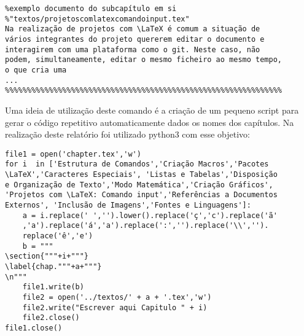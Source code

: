 \begin{verbatim}
%exemplo documento do subcapítulo em si
%"textos/projetoscomlatexcomandoinput.tex"
Na realização de projetos com \LaTeX é comum a situação de
vários integrantes do projeto quererem editar o documento e
interagirem com uma plataforma como o git. Neste caso, não
podem, simultaneamente, editar o mesmo ficheiro ao mesmo tempo,
o que cria uma
...
%%%%%%%%%%%%%%%%%%%%%%%%%%%%%%%%%%%%%%%%%%%%%%%%%%%%%%%%%%%%%%%
\end{verbatim}

Uma ideia de utilização deste comando é a criação de um pequeno script para gerar o código repetitivo automaticamente dados os nomes dos capítulos. Na realização deste relatório foi utilizado python3 com esse objetivo:

\begin{verbatim}
file1 = open('chapter.tex','w')
for i  in ['Estrutura de Comandos','Criação Macros','Pacotes
\LaTeX','Caracteres Especiais', 'Listas e Tabelas','Disposição
e Organização de Texto','Modo Matemática','Criação Gráficos',
'Projetos com \LaTeX: Comando input','Referências a Documentos
Externos', 'Inclusão de Imagens','Fontes e Linguagens']:
    a = i.replace(' ','').lower().replace('ç','c').replace('ã'
    ,'a').replace('á','a').replace(':','').replace('\\','').
    replace('ê','e')
    b = """
\section{"""+i+"""}
\label{chap."""+a+"""}
\n"""
    file1.write(b)
    file2 = open('../textos/' + a + '.tex','w')
    file2.write("Escrever aqui Capitulo " + i)
    file2.close()
file1.close()
\end{verbatim}






